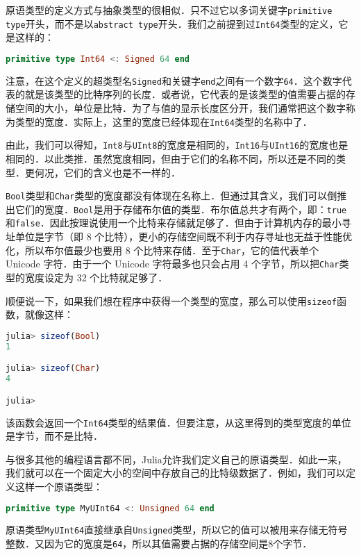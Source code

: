 原语类型的定义方式与抽象类型的很相似．只不过它以多词关键字\verb|primitive type|开头，而不是以\verb|abstract type|开头．我们之前提到过\verb|Int64|类型的定义，它是这样的：

\begin{lstlisting}[language=julia]
primitive type Int64 <: Signed 64 end
\end{lstlisting}

注意，在这个定义的超类型名\verb|Signed|和关键字\verb|end|之间有一个数字\verb|64|．这个数字代表的就是该类型的比特序列的长度．或者说，它代表的是该类型的值需要占据的存储空间的大小，单位是比特．为了与值的显示长度区分开，我们通常把这个数字称为类型的宽度．实际上，这里的宽度已经体现在\verb|Int64|类型的名称中了．

由此，我们可以得知，\verb|Int8|与\verb|UInt8|的宽度是相同的，\verb|Int16|与\verb|UInt16|的宽度也是相同的．以此类推．虽然宽度相同，但由于它们的名称不同，所以还是不同的类型．更何况，它们的含义也是不一样的．

\verb|Bool|类型和\verb|Char|类型的宽度都没有体现在名称上．但通过其含义，我们可以倒推出它们的宽度．\verb|Bool|是用于存储布尔值的类型．布尔值总共才有两个，即：\verb|true|和\verb|false|．因此按理说使用一个比特来存储就足够了．但由于计算机内存的最小寻址单位是字节（即 8 个比特），更小的存储空间既不利于内存寻址也无益于性能优化，所以布尔值最少也要用 8 个比特来存储．至于\verb|Char|，它的值代表单个 Unicode 字符．由于一个 Unicode 字符最多也只会占用 4 个字节，所以把\verb|Char|类型的宽度设定为 32 个比特就足够了．

顺便说一下，如果我们想在程序中获得一个类型的宽度，那么可以使用\verb|sizeof|函数，就像这样：

\begin{lstlisting}[language=julia]
julia> sizeof(Bool)
1

julia> sizeof(Char)
4

julia> 
\end{lstlisting}

该函数会返回一个\verb|Int64|类型的结果值．但要注意，从这里得到的类型宽度的单位是字节，而不是比特．

与很多其他的编程语言都不同，Julia允许我们定义自己的原语类型．如此一来，我们就可以在一个固定大小的空间中存放自己的比特级数据了．例如，我们可以定义这样一个原语类型：

\begin{lstlisting}[language=julia]
primitive type MyUInt64 <: Unsigned 64 end
\end{lstlisting}

原语类型\verb|MyUInt64|直接继承自\verb|Unsigned|类型，所以它的值可以被用来存储无符号整数．又因为它的宽度是\verb|64|，所以其值需要占据的存储空间是8个字节．

